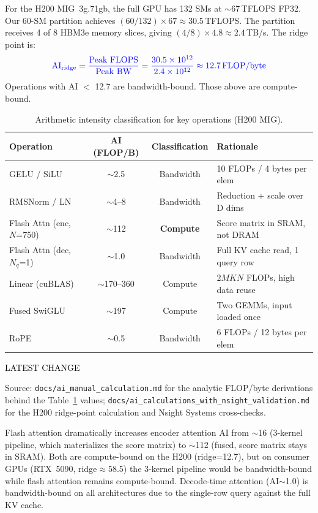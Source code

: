 \documentclass{article}
\newcommand{\chg}[1]{{\color{blue}#1}}
\newcommand{\latestchglabel}{{\setlength{\fboxsep}{1pt}\colorbox{yellow!65}{\textcolor{black}{\scriptsize LATEST CHANGE}}}}
\newcommand{\latestsource}[1]{%
  \par\noindent
  {\footnotesize \latestchglabel\ \parbox[t]{0.9\linewidth}{#1}}\par
}
\begin{document}
For the H200 MIG~3g.71gb, the full GPU has 132 SMs at $\sim$67\,TFLOPS FP32. Our 60-SM partition achieves $(60/132) \times 67 \approx 30.5$\,TFLOPS.  The partition receives 4 of 8 HBM3e memory slices, giving $(4/8) \times 4.8 \approx 2.4$\,TB/s.  The ridge point is:
\begin{equation}
\chg{\text{AI}_{\text{ridge}} = \frac{\text{Peak FLOPS}}{\text{Peak BW}} = \frac{30.5 \times 10^{12}}{2.4 \times 10^{12}} \approx 12.7 \text{\,FLOP/byte}}
\end{equation}
Operations with AI $<$ 12.7 are bandwidth-bound. Those above are compute-bound.

\begin{table}[h]
\centering
\caption{Arithmetic intensity classification for key operations (H200 MIG).}
\label{tab:ai}
\small
\begin{tabular}{@{}lccl@{}}
\toprule
\textbf{Operation} & \textbf{AI (FLOP/B)} & \textbf{Classification} & \textbf{Rationale} \\
\midrule
GELU / SiLU & $\sim$2.5 & Bandwidth & 10 FLOPs / 4 bytes per elem \\
RMSNorm / LN & $\sim$4--8 & Bandwidth & Reduction + scale over D dims \\
Flash Attn (enc, $N$=750) & $\sim$112 & \textbf{Compute} & Score matrix in SRAM, not DRAM \\
Flash Attn (dec, $N_q$=1) & $\sim$1.0 & Bandwidth & Full KV cache read, 1 query row \\
Linear (cuBLAS) & $\sim$170--360 & Compute & $2MKN$ FLOPs, high data reuse \\
Fused SwiGLU & $\sim$197 & Compute & Two GEMMs, input loaded once \\
RoPE & $\sim$0.5 & Bandwidth & 6 FLOPs / 12 bytes per elem \\
\bottomrule
\end{tabular}
\end{table}

\latestsource{Source: \texttt{docs/ai\_manual\_calculation.md} for the analytic FLOP/byte derivations behind the Table~\ref{tab:ai} values; \texttt{docs/ai\_calculations\_with\_nsight\_validation.md} for the H200 ridge-point calculation and Nsight Systems cross-checks.}

Flash attention dramatically increases encoder attention AI from $\sim$16 (3-kernel pipeline, which materializes the score matrix) to $\sim$112 (fused, score matrix stays in SRAM).  Both are compute-bound on the H200 (ridge=12.7), but on consumer GPUs (RTX~5090, ridge$\approx$58.5) the 3-kernel pipeline would be bandwidth-bound while flash attention remains compute-bound.  Decode-time attention (AI$\sim$1.0) is bandwidth-bound on all architectures due to the single-row query against the full KV cache.
\end{document}
